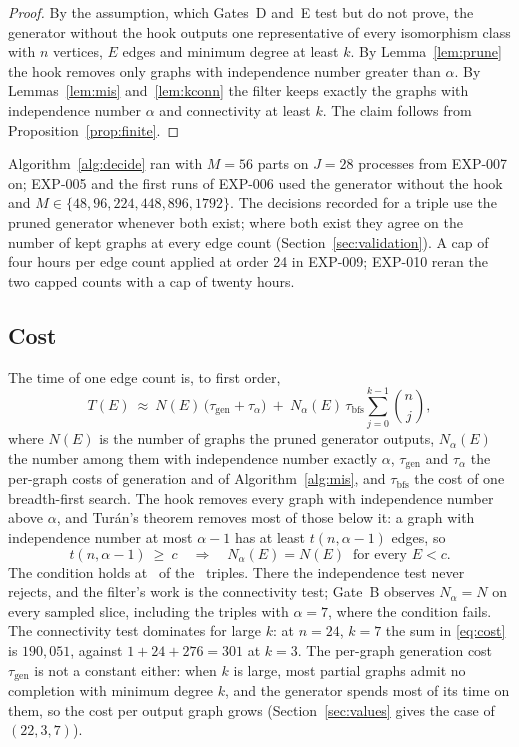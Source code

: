 \documentclass[11pt]{article}
\theoremstyle{definition}
\theoremstyle{remark}
\begin{document}
\begin{proof}
By the assumption, which Gates~D and~E test but do not prove, the generator without the hook outputs one
representative of every isomorphism class with $n$ vertices, $E$ edges and minimum degree at least $k$. By
Lemma~\ref{lem:prune} the hook removes only graphs with independence number greater than $\alpha$. By
Lemmas~\ref{lem:mis} and~\ref{lem:kconn} the filter keeps exactly the graphs with independence number $\alpha$ and
connectivity at least $k$. The claim follows from Proposition~\ref{prop:finite}.
\end{proof}

Algorithm~\ref{alg:decide} ran with $M=56$ parts on $J=28$ processes from EXP-007 on; EXP-005 and the first runs of
EXP-006 used the generator without the hook and $M\in\{48,96,224,448,896,1792\}$. The decisions recorded for a triple use the
pruned generator whenever both exist; where both exist they agree on the number of kept graphs at every edge count
(Section~\ref{sec:validation}). A cap of four hours per edge count applied at order 24 in EXP-009; EXP-010 reran
the two capped counts with a cap of twenty hours.


\subsection{Cost}

The time of one edge count is, to first order,
\begin{equation}\label{eq:cost}
T(E)\ \approx\ N(E)\,\bigl(\tau_{\mathrm{gen}}+\tau_{\alpha}\bigr)\ +\ N_\alpha(E)\,\tau_{\mathrm{bfs}}
\sum_{j=0}^{k-1}\binom{n}{j},
\end{equation}
where $N(E)$ is the number of graphs the pruned generator outputs, $N_\alpha(E)$ the number among them with
independence number exactly $\alpha$, $\tau_{\mathrm{gen}}$ and $\tau_\alpha$ the per-graph costs of generation and of
Algorithm~\ref{alg:mis}, and $\tau_{\mathrm{bfs}}$ the cost of one breadth-first search. The hook removes every graph
with independence number above $\alpha$, and Tur\'an's theorem removes most of those below it: a graph with
independence number at most $\alpha-1$ has at least $t(n,\alpha-1)$ edges, so
\begin{equation}\label{eq:allalpha}
t(n,\alpha-1)\ \ge\ c\quad\Longrightarrow\quad N_\alpha(E)=N(E)\ \text{ for every } E<c .
\end{equation}
The condition holds at \nturancond\ of the \ntriples\ triples. There the independence test never rejects, and the
filter's work is the connectivity test; Gate~B observes $N_\alpha=N$ on every sampled slice, including the triples
with $\alpha=7$, where the condition fails. The connectivity test dominates for large $k$: at $n=24$, $k=7$ the sum in
\eqref{eq:cost} is $190{,}051$, against $1+24+276=301$ at $k=3$. The per-graph generation cost $\tau_{\mathrm{gen}}$ is
not a constant either: when $k$ is large, most partial graphs admit no completion with minimum degree $k$, and the
generator spends most of its time on them, so the cost per output graph grows (Section~\ref{sec:values} gives the case
of $(22,3,7)$).
\end{document}
